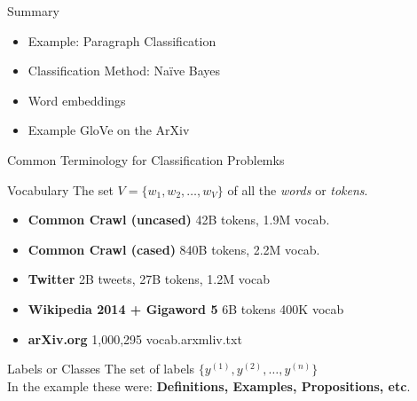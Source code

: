 \documentclass[handout]{beamer}
\begin{document}
\begin{frame}{Summary}
    \begin{itemize}
            \item Example: Paragraph Classification
            \item Classification Method: Na\"ive Bayes
            \item Word embeddings
            \item Example GloVe on the ArXiv 
    \end{itemize}
\end{frame}
\begin{frame}{Common Terminology for Classification Problemks}
    \begin{exampleblock}{Vocabulary}
        The set $V = \{w_1,w_2,\ldots, w_V\}$ of all the \textit{words} or \textit{tokens}.
    \end{exampleblock}
        \begin{itemize}
            \item \textbf{Common Crawl (uncased)} 42B tokens, 1.9M vocab.
            \item \textbf{Common Crawl (cased)} 840B tokens, 2.2M vocab.
            \item \textbf{Twitter} 2B tweets, 27B tokens, 1.2M vocab
            \item \textbf{Wikipedia 2014 + Gigaword 5} 6B tokens 400K vocab
            \item \textbf{arXiv.org} 1,000,295 vocab.arxmliv.txt
        \end{itemize}

        \begin{exampleblock}{Labels or Classes}
            The set of labels $\{y^{(1)},y^{(2)},\ldots, y^{(n)}\}$\\
            In the example these were: \textbf{Definitions, Examples, Propositions, etc}.
        \end{exampleblock}


\end{frame}
\end{document}

